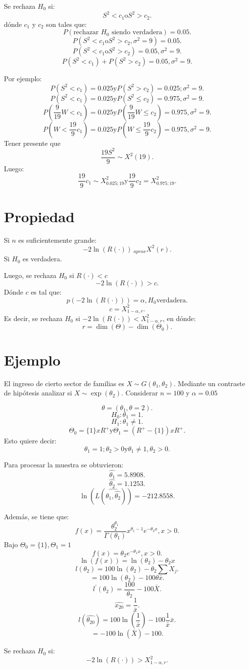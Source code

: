 \documentclass{article}
\begin{document}
Se rechaza $H_{0}$ si:
\[S^{2} < c_{1}\text{o} S^{2} > c_{2}.\]
dónde $c_{1}$ y $c_{2}$ son tales que:
\[P(\text{rechazar $H_{0}$ siendo verdadera})=0.05.\]
\[P(S^{2}<c_{1} \text{o} S^{2}>c_{2}, \sigma^{2}=9)=0.05.\]
\[P(S^{2}<c_{1} \text{o} S^{2}>c_{2}) = 0.05, \sigma^{2}=9.\]
\[P(S^{2}<c_{1})+P(S^{2}>c_{2})=0.05,\sigma^{2}=9.\]

Por ejemplo:
\[P(S^{2}<c_{1})= 0.025 \text{y} P(S^{2}>c_{2})=0.025; \sigma^{2}=9.\]
\[P(S^{2}<c_{1})=0.025 \text{y} P(S^{2}\leq c_{2})=0.975, \sigma^{2}=9.\]
\[P(\frac{9}{19}W < c_{1})=0.025 \text{y} P(\frac{9}{19}W \leq c_{2})=0.975, \sigma^{2}=9.\]
\[P(W<\frac{19}{9}c_{1})=0.025 \text{y} P(W\leq \frac{19}{9}c_{2})=0.975, \sigma^{2}=9.\]
Tener presente que
\[\frac{19 S^{2}}{9} \sim X^{2}(19).\]
Luego:
\[\frac{19}{9}c_{1} \sim X^{2}_{0.025;19} \text{y} \frac{19}{9}c_{2}=X^{2}_{0.975;19}.\]

\section{Propiedad}
Si $n$ es suficientemente grande:
\[-2\ln(R(\cdot))~_{aprox}X^{2}(r).\]
Si $H_{0}$ es verdadera.

Luego, se rechaza $H_{0}$ si $R(\cdot) < c$
\[-2 \ln(R(\cdot))> c.\]
Dónde $c$ es tal que:
\[p(-2\ln(R(\cdot)))=\alpha,H_{0} \text{verdadera}.\]
\[c=X^{2}_{1-\alpha, r}.\]
Es decir, se rechaza $H_{0}$ si $-2\ln(R(\cdot))<X^{2}_{1-\alpha,r}$, en dónde:
\[r = \dim(\Theta)-\dim(\Theta_{0}).\]

\section{Ejemplo}
El ingreso de cierto sector de familias es $X\sim G(\theta_{1},\theta_{2})$. Mediante un contraste de hipótesis analizar si $X\sim \exp(\theta_{2})$. Considerar $n=100$ y $\alpha=0.05$

\[\theta=(\theta_{1},\theta=2).\]
\[H_{0}:\theta_{1}=1.\]
\[H_{1}:\theta_{1}\neq 1.\]
\[\Theta_{0}=\{1\}xR^{+} \text{y} \Theta_{1}=(R^{+}-\{1\})x R^{+}.\]
Esto quiere decir:
\[\theta_{1}=1;\theta_{2}>0 \text{y} \theta_{1} \neq 1, \theta_{2} >0.\]

Para procesar la muestra se obtuvieron:
\[\hat{\theta_{1}}=5.8908.\]
\[\hat{\theta_{2}}=1.1253.\]
\[\ln(L(\hat{\theta_{1},\hat{\theta_{2}}}))=-212.8558.\]

Además, se tiene que:
\[f(x)=\frac{\theta_{2}^{\theta_{1}}}{\Gamma(\theta_{1})}x^{\theta_{1}-1}e^{-\theta_{2}x},x>0.\]
Bajo $\Theta_{0}=\{1\}, \Theta_{1}=1$
\[f(x)=\theta_{2}e^{-\theta_{1}x}, x>0.\]
\[\ln(f(x))=\ln(\theta_{2})-\theta_{2}x\]
\[l(\theta_{2})=100\ln(\theta_{2})-\theta_{2}\sum X_{j}.\]
\[=100 \ln(\theta_{2})-100\theta\bar{x}.\]
\[l^{'}(\theta_{2})=\frac{100}{\theta_{2}}-100\bar{X}.\]
\[\hat{x_{20}}=\frac{1}{\bar{x}}.\]
\[l(\hat{\theta_{20}})=100 \ln(\frac{1}{\bar{x}})-100 \frac{1}{\bar{x}}\bar{x}.\]
\[=-100\ln(\bar{X})-100.\]

Se rechaza $H_{0}$ si:
\[-2 \ln(R(\cdot))> X^{2}_{1-\alpha,r}.\]
\end{document}
